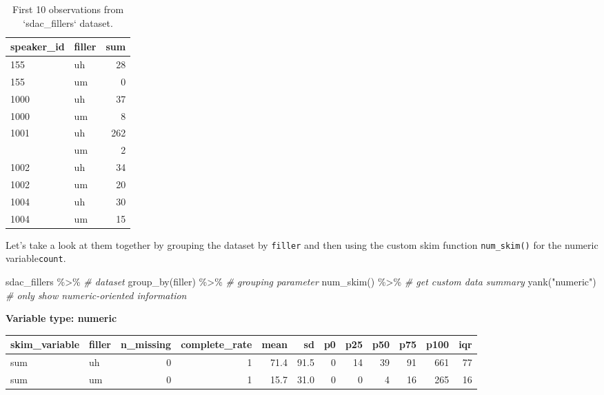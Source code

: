 \documentclass[
]{article}
\newenvironment{Shaded}{\begin{snugshade}}{\end{snugshade}}
\newcommand{\CommentTok}[1]{\textcolor[rgb]{0.56,0.35,0.01}{\textit{#1}}}
\newcommand{\FunctionTok}[1]{\textcolor[rgb]{0.00,0.00,0.00}{#1}}
\newcommand{\NormalTok}[1]{#1}
\newcommand{\SpecialCharTok}[1]{\textcolor[rgb]{0.00,0.00,0.00}{#1}}
\newcommand{\StringTok}[1]{\textcolor[rgb]{0.31,0.60,0.02}{#1}}
\begin{document}
\begin{table}

\caption{\label{tab:i-bi-cont-sdac-fillers-preview}First 10 observations from `sdac_fillers` dataset.}
\centering
\begin{tabular}[t]{llr}
\toprule
speaker\_id & filler & sum\\
\midrule
155 & uh & 28\\
155 & um & 0\\
1000 & uh & 37\\
1000 & um & 8\\
1001 & uh & 262\\
\addlinespace
1001 & um & 2\\
1002 & uh & 34\\
1002 & um & 20\\
1004 & uh & 30\\
1004 & um & 15\\
\bottomrule
\end{tabular}
\end{table}

Let's take a look at them together by grouping the dataset by \texttt{filler} and then using the custom skim function \texttt{num\_skim()} for the numeric variable\texttt{count}.

\begin{Shaded}
\begin{Highlighting}[]
\NormalTok{sdac\_fillers }\SpecialCharTok{\%\textgreater{}\%} \CommentTok{\# dataset}
  \FunctionTok{group\_by}\NormalTok{(filler) }\SpecialCharTok{\%\textgreater{}\%} \CommentTok{\# grouping parameter}
  \FunctionTok{num\_skim}\NormalTok{() }\SpecialCharTok{\%\textgreater{}\%} \CommentTok{\# get custom data summary}
  \FunctionTok{yank}\NormalTok{(}\StringTok{"numeric"}\NormalTok{) }\CommentTok{\# only show numeric{-}oriented information}
\end{Highlighting}
\end{Shaded}

\textbf{Variable type: numeric}

\begin{tabular}{l|l|r|r|r|r|r|r|r|r|r|r}
\hline
skim\_variable & filler & n\_missing & complete\_rate & mean & sd & p0 & p25 & p50 & p75 & p100 & iqr\\
\hline
sum & uh & 0 & 1 & 71.4 & 91.5 & 0 & 14 & 39 & 91 & 661 & 77\\
\hline
sum & um & 0 & 1 & 15.7 & 31.0 & 0 & 0 & 4 & 16 & 265 & 16\\
\hline
\end{tabular}
\end{document}
